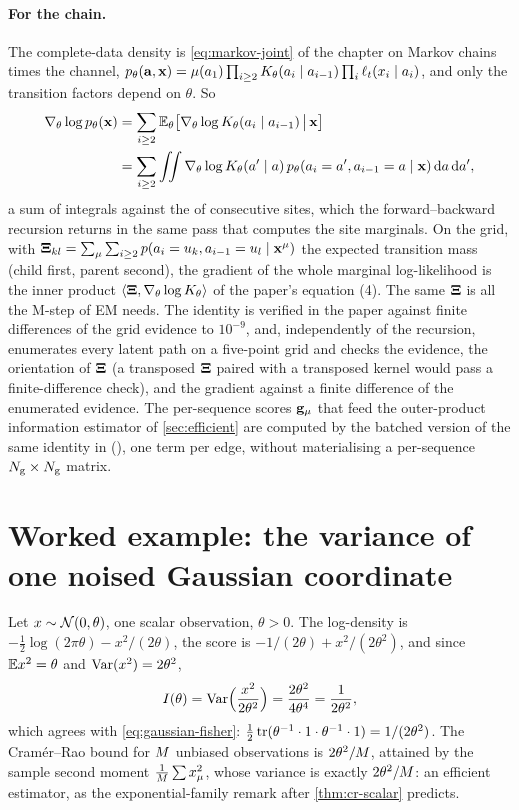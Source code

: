 \paragraph{For the chain.}
The complete-data density is \cref{eq:markov-joint} of the chapter on Markov chains
times the channel, $p_\theta(\mathbf{a},\mathbf{x})=\mu(a_1)\prod_{i\ge2}K_{\theta}(a_i\mid a_{i-1})\prod_i\ell_t(x_i\mid a_i)$,
and only the transition factors depend on $\theta$. So
\begin{equation}
\begin{aligned}
  \nabla_\theta\log p_\theta(\mathbf{x})&=\sum_{i\ge2}\mathbb{E}_\theta\bigl[\nabla_\theta\log K_{\theta}(a_i\mid a_{i-1})\,\big|\,\mathbf{x}\bigr]\\
  &=\sum_{i\ge2}\iint\nabla_\theta\log K_{\theta}(a'\mid a)\,p_\theta(a_i=a',a_{i-1}=a\mid\mathbf{x})\,\mathrm{d} a\,\mathrm{d} a' ,
\end{aligned}
\end{equation}
a sum of integrals against the  of consecutive
sites, which the forward--backward recursion returns in the same pass that computes
the site marginals. On the grid, with $\mathbf{\Xi}_{kl}=\sum_\mu\sum_{i\ge2}p(a_i=u_{k},a_{i-1}=u_{l}\mid\mathbf{x}^\mu)$
the expected transition mass (child first, parent second), the gradient of the whole
marginal log-likelihood is the inner product $\langle\mathbf{\Xi},\nabla_\theta\log K_{\theta}\rangle$
of the paper's equation (4). The same $\mathbf{\Xi}$ is all the M-step of EM needs. The
identity is verified in the paper against finite differences of the grid evidence to
$10^{-9}$, and, independently of the recursion, 
enumerates every latent path on a five-point grid and checks the evidence, the
orientation of $\mathbf{\Xi}$ (a transposed $\mathbf{\Xi}$ paired with a transposed kernel would pass a
finite-difference check), and the gradient against a finite difference of the
enumerated evidence. The per-sequence scores $\mathbf{g}_\mu$ that feed the outer-product
information estimator of \cref{sec:efficient} are computed by the batched version of
the same identity in 
(), one term per edge, without materialising a per-sequence
$N_{\mathrm{g}}\times N_{\mathrm{g}}$ matrix.

\section{Worked example: the variance of one noised Gaussian coordinate}

Let $x\sim\mathcal{N}\!\left(0,\theta\right)$, one scalar observation, $\theta>0$. The log-density is
$-\tfrac12\log(2\pi\theta)-x^2/(2\theta)$, the score is $-1/(2\theta)+x^2/(2\theta^2)$, and
since $\mathbb{E} x^2=\theta$ and $\operatorname{Var}(x^2)=2\theta^2$,
\[
  I(\theta)=\operatorname{Var}\Bigl(\frac{x^2}{2\theta^2}\Bigr)=\frac{2\theta^2}{4\theta^4}=\frac1{2\theta^2},
\]
which agrees with \cref{eq:gaussian-fisher}: $\tfrac12\operatorname{tr}(\theta^{-1}\cdot1\cdot\theta^{-1}\cdot1)=1/(2\theta^2)$.
The Cram\'er--Rao bound for $M$ unbiased observations is $2\theta^2/M$, attained
by the sample second moment $\tfrac1{M}\sum x_\mu^2$, whose variance is exactly
$2\theta^2/M$: an efficient estimator, as the exponential-family remark after
\cref{thm:cr-scalar} predicts.

